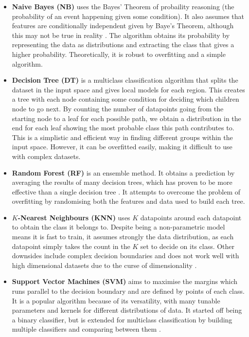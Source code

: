 \begin{itemize}
  \item \textbf{Naive Bayes (NB)} uses the Bayes' Theorem of probaility reasoning (the probability of an event happening given some condition). It also assumes that features are conditionally independent given by Baye's Theorem, although this may not be true in reality \cite{mur-book}. The algorithm obtains its probability by representing the data as distributions and extracting the class that gives a higher probability. Theoretically, it is robust to overfitting and a simple algorithm.

  \item \textbf{Decision Tree (DT)} is a multiclass classification algorithm that splits the dataset in the input space and gives local models for each region. This creates a tree with each node containing some condition for deciding which children node to go next. By counting the number of datapoints going from the starting node to a leaf for each possible path, we obtain a distribution in the end for each leaf showing the most probable class this path contributes to. This is a simplistic and efficient way in finding different groups within the input space. However, it can be overfitted easily, making it difficult to use with complex datasets. \cite{mur-book}

  \item \textbf{Random Forest (RF)} is an ensemble method. It obtains a prediction by averaging the results of many decision trees, which has proven to be more effective than a single decision tree \cite{compare-supervised}. It attempts to overcome the problem of overfitting by randomising both the features and data used to build each tree.

  \item \textbf{$K$-Nearest Neighbours (KNN)} uses $K$ datapoints around each datapoint to obtain the class it belongs to. Despite being a non-parametric model means it is fast to train, it assumes strongly the data distribution, as each datapoint simply takes the count in the $K$ set to decide on its class. Other downsides include complex decision boundaries and does not work well with high dimensional datasets due to the curse of dimensionality \cite{mur-book}. 

  \item \textbf{Support Vector Machines (SVM)} aims to maximise the margins which runs parallel to the decision boundary and are defined by points of each class. It is a popular algorithm because of its versatility, with many tunable parameters and kernels for different distributions of data. It started off being a binary classifier, but is extended for multiclass classification by building multiple classifiers and comparing between them \cite{bishop-book}. 
\end{itemize}

